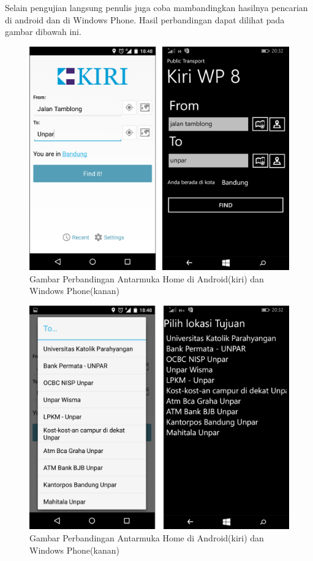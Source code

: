 Selain pengujian langsung penulis juga coba mambandingkan hasilnya pencarian di android dan di Windows Phone. Hasil perbandingan dapat dilihat pada gambar dibawah ini.

	\begin{figure}[!h]
		\centering
			\includegraphics[scale=0.15]{Gambar/perbandingan/perbandingan_home}
		\caption{Gambar Perbandingan Antarmuka Home di Android(kiri) dan Windows Phone(kanan)}
		\label{fig:perbandinganHome}
	\end{figure}

	\begin{figure}[!h]
		\centering
			\includegraphics[scale=0.15]{Gambar/perbandingan/perbandingan_pilih}
		\caption{Gambar Perbandingan Antarmuka Home di Android(kiri) dan Windows Phone(kanan)}
		\label{fig:perbandinganPilih}
	\end{figure}
	
